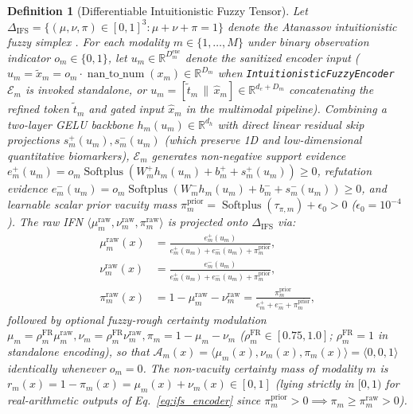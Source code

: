 \documentclass[10pt,twocolumn]{article}
\newtheorem{definition}{Definition}
\begin{document}
\begin{definition}[Differentiable Intuitionistic Fuzzy Tensor]
\label{def:ifn}
Let $\Delta_{\text{IFS}} = \{(\mu, \nu, \pi) \in [0,1]^3 : \mu + \nu + \pi = 1\}$ denote the
Atanassov intuitionistic fuzzy simplex \cite{atanassov1986intuitionistic}. For each modality $m
\in \{1,\dots,M\}$ under binary observation indicator $o_m \in \{0,1\}$, let $u_m \in
\mathbb{R}^{D_m^{\text{enc}}}$ denote the sanitized encoder input ($u_m = \tilde{x}_m = o_m
\cdot \operatorname{nan\_to\_num}(x_m) \in \mathbb{R}^{D_m}$ when
\texttt{IntuitionisticFuzzyEncoder} $\mathcal{E}_m$ is invoked standalone, or $u_m =
[\tilde{t}_m \,\|\, \hat{x}_m] \in \mathbb{R}^{d_e + D_m}$ concatenating the refined token
$\tilde{t}_m$ and gated input $\hat{x}_m$ in the multimodal pipeline). Combining a two-layer
GELU backbone $h_m(u_m) \in \mathbb{R}^{d_h}$ with direct linear residual skip projections
$s_m^+(u_m), \allowbreak s_m^-(u_m)$ (which preserve 1D and low-dimensional quantitative
biomarkers), $\mathcal{E}_m$ generates non-negative support evidence $e_m^+(u_m) = \allowbreak
o_m \operatorname{Softplus}\allowbreak(W_m^+ h_m(u_m) + b_m^+ + s_m^+(u_m)) \ge 0$, refutation
evidence $e_m^-(u_m) = \allowbreak o_m \operatorname{Softplus}\allowbreak(W_m^- h_m(u_m) +
b_m^- + s_m^-(u_m)) \ge 0$, and learnable scalar prior vacuity mass $\pi_m^{\text{prior}} =
\operatorname{Softplus}(\tau_{\pi,m}) + \epsilon_0 > 0$ ($\epsilon_0 = 10^{-4}$). The raw IFN
$\langle \mu_m^{\text{raw}}, \nu_m^{\text{raw}}, \pi_m^{\text{raw}} \rangle$ is projected onto
$\Delta_{\text{IFS}}$ via:
\begin{equation}
\label{eq:ifs_encoder}
\begin{aligned}
\mu_m^{\text{raw}}(x) &= \frac{e_m^+(u_m)}{e_m^+(u_m) + e_m^-(u_m) + \pi_m^{\text{prior}}}, \\
\nu_m^{\text{raw}}(x) &= \frac{e_m^-(u_m)}{e_m^+(u_m) + e_m^-(u_m) + \pi_m^{\text{prior}}}, \\
\pi_m^{\text{raw}}(x) &= 1 - \mu_m^{\text{raw}} - \nu_m^{\text{raw}} =
\frac{\pi_m^{\text{prior}}}{e_m^+ + e_m^- + \pi_m^{\text{prior}}},
\end{aligned}
\end{equation}
followed by optional fuzzy-rough certainty modulation $\mu_m =
\rho_m^{\text{FR}}\mu_m^{\text{raw}}, \allowbreak \nu_m = \rho_m^{\text{FR}}\nu_m^{\text{raw}},
\allowbreak \pi_m = 1 - \mu_m - \nu_m$ ($\rho_m^{\text{FR}} \in [0.75, 1.0]$;
$\rho_m^{\text{FR}} = 1$ in standalone encoding), so that $\mathcal{A}_m(x) = \langle \mu_m(x),
\nu_m(x), \pi_m(x)\rangle = \langle 0, 0, 1\rangle$ identically whenever $o_m = 0$. The
non-vacuity certainty mass of modality $m$ is $r_m(x) = 1 - \pi_m(x) = \mu_m(x) + \nu_m(x) \in
[0, 1]$ (lying strictly in $[0, 1)$ for real-arithmetic outputs of Eq.~\eqref{eq:ifs_encoder}
since $\pi_m^{\text{prior}} > 0 \implies \pi_m \ge \pi_m^{\text{raw}} > 0$).
\end{definition}
\end{document}
